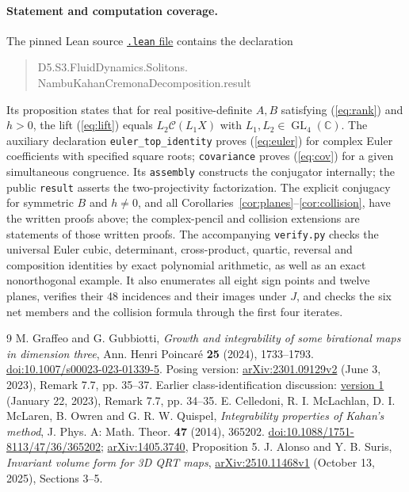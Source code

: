 \documentclass[11pt]{article}
\newcommand{\C}{\mathbb C}
\newcommand{\Cr}{\mathcal C}
\begin{document}
\paragraph{Statement and computation coverage.}
The pinned Lean source
\href{https://github.com/the-omega-institute/trureturing/blob/86172888e706177b6c1d135cb12aec3b6d2cdce8/D5/S3/FluidDynamics/Solitons/NambuKahanCremonaDecomposition.lean}{\texttt{.lean} file}
contains the declaration
\begin{quote}\small\ttfamily
D5.S3.FluidDynamics.Solitons.\\
NambuKahanCremonaDecomposition.result
\end{quote}
Its proposition states that for real positive-definite $A,B$ satisfying
(\ref{eq:rank}) and $h>0$, the lift (\ref{eq:lift}) equals
$L_2\Cr(L_1X)$ with $L_1,L_2\in\operatorname{GL}_4(\C)$.
The auxiliary declaration \texttt{euler\_top\_identity}
proves (\ref{eq:euler}) for complex Euler coefficients with specified
square roots; \texttt{covariance} proves (\ref{eq:cov}) for a given
simultaneous congruence. Its \texttt{assembly} constructs the conjugator
internally; the public \texttt{result} asserts the two-projectivity factorization.
The explicit conjugacy for symmetric $B$ and $h\ne0$, and all
Corollaries~\ref{cor:planes}--\ref{cor:collision}, have the written proofs above;
the complex-pencil and collision extensions are statements of those written proofs.
The accompanying \texttt{verify.py} checks the universal Euler cubic,
determinant, cross-product, quartic, reversal and composition identities by
exact polynomial arithmetic, as well as an exact nonorthogonal example.
It also enumerates all eight sign points and twelve planes, verifies their
48 incidences and their images under $J$, and checks the six net members
and the collision formula through the first four iterates.

\begin{thebibliography}{9}
 M. Graffeo and G. Gubbiotti,
\emph{Growth and integrability of some birational maps in dimension three},
Ann. Henri Poincar\'e \textbf{25} (2024), 1733--1793.
\href{https://doi.org/10.1007/s00023-023-01339-5}{doi:10.1007/s00023-023-01339-5}.
Posing version: \href{https://arxiv.org/abs/2301.09129v2}{arXiv:2301.09129v2}
(June 3, 2023), Remark 7.7, pp. 35--37.
Earlier class-identification discussion:
\href{https://arxiv.org/abs/2301.09129v1}{version 1} (January 22, 2023),
Remark 7.7, pp. 34--35.
 E. Celledoni, R. I. McLachlan, D. I. McLaren,
B. Owren and G. R. W. Quispel,
\emph{Integrability properties of Kahan's method},
J. Phys. A: Math. Theor. \textbf{47} (2014), 365202.
\href{https://doi.org/10.1088/1751-8113/47/36/365202}{doi:10.1088/1751-8113/47/36/365202};
\href{https://arxiv.org/abs/1405.3740}{arXiv:1405.3740}, Proposition 5.
 J. Alonso and Y. B. Suris,
\emph{Invariant volume form for 3D QRT maps},
\href{https://arxiv.org/abs/2510.11468v1}{arXiv:2510.11468v1}
(October 13, 2025), Sections 3--5.
\end{thebibliography}
\end{document}
